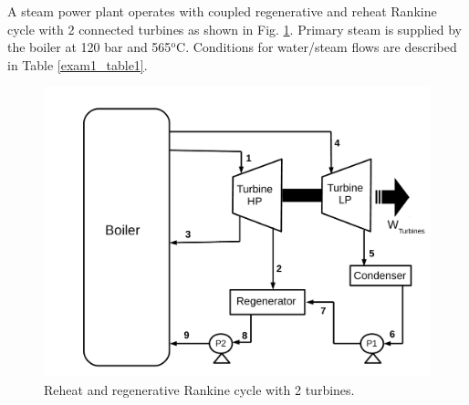 \documentclass[calculator,steamtables,refrigeranttables]{exam}
\begin{document}
\begin{question} %
A steam power plant operates with coupled regenerative and reheat Rankine cycle with 2 connected turbines as shown in Fig. \ref{exam_mod02_rankinecycle}.  Primary steam is supplied by the boiler at 120 bar and 565$^{\text{o}}$C. Conditions for water/steam flows are described in Table \ref{exam1_table1}. 

\begin{figure}[h]
\begin{center}
\includegraphics[width=15.cm,clip]{./Pics/Exam_Reheat_Regenerative_Rankine_Cycle}
\caption{ Reheat and regenerative Rankine cycle with 2 turbines.}
\label{exam_mod02_rankinecycle}
\end{center}
\end{figure}


\end{question}
\end{document}
